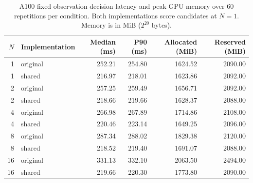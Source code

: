 \begin{table}[tb]
\centering\small
\caption{A100 fixed-observation decision latency and peak GPU memory over 60 repetitions per condition. Both implementations score candidates at $N=1$. Memory is in MiB ($2^{20}$ bytes).}
\label{tab:scaling}
\begin{tabular}{@{}rlrrrr@{}}
\toprule
$N$ & Implementation & Median (ms) & P90 (ms) & Allocated (MiB) & Reserved (MiB) \\
\midrule
1 & original & 252.21 & 254.80 & 1624.52 & 2090.00 \\
1 & shared & 216.97 & 218.01 & 1623.86 & 2092.00 \\
2 & original & 257.25 & 259.49 & 1656.71 & 2092.00 \\
2 & shared & 218.66 & 219.66 & 1628.37 & 2088.00 \\
4 & original & 266.98 & 267.89 & 1714.86 & 2108.00 \\
4 & shared & 220.46 & 223.14 & 1649.25 & 2096.00 \\
8 & original & 287.34 & 288.02 & 1829.38 & 2120.00 \\
8 & shared & 218.52 & 219.40 & 1691.07 & 2088.00 \\
16 & original & 331.13 & 332.10 & 2063.50 & 2494.00 \\
16 & shared & 219.66 & 220.30 & 1773.80 & 2090.00 \\
\bottomrule
\end{tabular}
\end{table}
